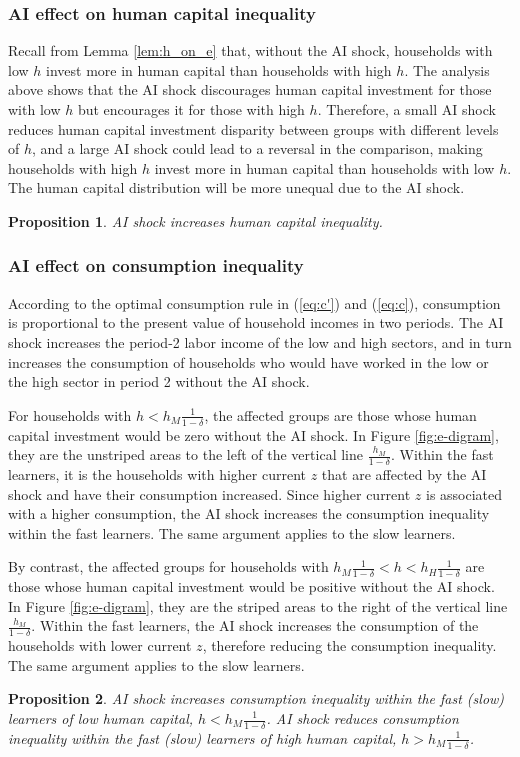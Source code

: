 \documentclass[12pt]{article}
\newtheorem{proposition}{Proposition}
\begin{document}
\subsubsection{AI effect on human capital inequality}
Recall from Lemma \ref{lem:h_on_e} that, without the AI shock, households with low $h$ invest more in human capital than households with high $h$. The analysis above shows that the AI shock discourages human capital investment for those with low $h$ but encourages it for those with high $h$. Therefore, a small AI shock reduces human capital investment disparity between groups with different levels of $h$, and a large AI shock could lead to a reversal in the comparison, making households with high $h$ invest more in human capital than households with low $h$. The human capital distribution will be more unequal due to the AI shock. 
\begin{proposition}
    AI shock increases human capital inequality.
\end{proposition}

\subsubsection{AI effect on consumption inequality}
According to the optimal consumption rule in (\ref{eq:c'}) and (\ref{eq:c}), consumption is proportional to the present value of household incomes in two periods. The AI shock increases the period-2 labor income of the low and high sectors, and in turn increases the consumption of households who would have worked in the low or the high sector in period 2 without the AI shock. 

For households with $h<h_M\frac{1}{1-\delta}$, the affected groups are those whose human capital investment would be zero without the AI shock. In Figure \ref{fig:e-digram}, they are the unstriped areas to the left of the vertical line $\frac{h_M}{1-\delta}$. Within the fast learners, it is the households with higher current $z$ that are affected by the AI shock and have their consumption increased. Since higher current $z$ is associated with a higher consumption, the AI shock increases the consumption inequality within the fast learners. The same argument applies to the slow learners. 

By contrast, the affected groups for households with $h_M\frac{1}{1-\delta}<h<h_H\frac{1}{1-\delta}$ are those whose human capital investment would be positive without the AI shock. In Figure \ref{fig:e-digram}, they are the striped areas to the right of the vertical line $\frac{h_M}{1-\delta}$. Within the fast learners, the AI shock increases the consumption of the households with lower current $z$, therefore reducing the consumption inequality. The same argument applies to the slow learners. 
\begin{proposition}
    AI shock increases consumption inequality within the fast (slow) learners of low human capital, $h<h_M\frac{1}{1-\delta}$. AI shock reduces consumption inequality within the fast (slow) learners of high human capital, $h>h_M\frac{1}{1-\delta}$.
\end{proposition}
\end{document}
